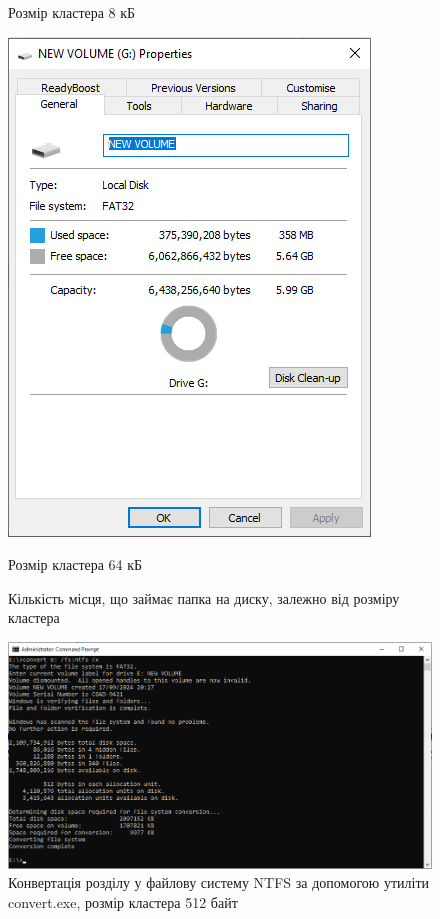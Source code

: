 \documentclass[oneside,14pt]{extarticle}
\begin{document}
\begin{normalsize}
\begin{figure}[H]
\begin{minipage}{0.3\textwidth}
			\caption*{Розмір кластера 8 кБ}
		\end{minipage}
		\hfill
		\begin{minipage}{0.3\textwidth}
			\centering
			\includegraphics[scale=0.5]{6}
			\caption*{Розмір кластера 64 кБ}
		\end{minipage}
		\caption{Кількість місця, що займає папка на диску, залежно від розміру кластера}	
	\end{figure}
	
	\begin{figure}[H]
		\centering
		\includegraphics[scale=0.5]{7}
		\caption{Конвертація розділу у файлову систему NTFS за допомогою утиліти convert.exe, розмір кластера 512 байт}
	\end{figure}
	

\end{normalsize}
\end{document}
